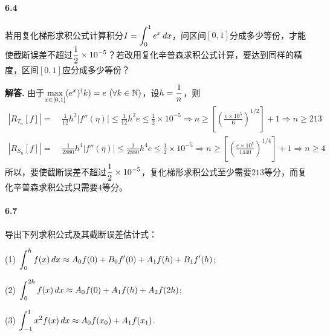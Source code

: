\documentclass[12pt, a4paper, oneside]{ctexart}
\newenvironment{solution}{\par\noindent\textbf{解答. }}{\bigskip\par}
\begin{document}
\paragraph{6.4}若用复化梯形求积公式计算积分$\displaystyle I = \int_0^1e^x\,dx$，问区间$[0,1]$分成多少等份，才能使截断误差不超过$\displaystyle\frac{1}{2}\times 10^{-5}$？若改用复化辛普森求积公式计算，要达到同样的精度，区间$[0,1]$应分成多少等份？
\begin{solution}
    由于$\displaystyle\max_{x\in[0,1]}(e^{x})^(k) = e\ (\forall k\in \mathbb{N})$，设$\displaystyle h = \frac{1}{n}$，则
    \begin{equation*}
        \begin{aligned}
            |R_{T_n}[f]| =&\ \frac{1}{12}h^2|f''(\eta)|\leqslant \frac{1}{12}h^2e\leqslant \frac{1}{2}\times10^{-5}\Rightarrow n\geqslant \left[\left(\frac{e\times 10^5}{6}\right)^{1/2}\right]+1\Rightarrow n\geqslant 213\\
            |R_{S_n}[f]| =&\ \frac{1}{2880}h^4|f''(\eta)|\leqslant \frac{1}{2880}h^4e\leqslant \frac{1}{2}\times10^{-5}\Rightarrow n\geqslant \left[\left(\frac{e\times 10^5}{1440}\right)^{1/4}\right]+1\Rightarrow n\geqslant 4
        \end{aligned}
    \end{equation*}
    所以，要使截断误差不超过$\displaystyle\frac{1}{2}\times10^{-5}$，复化梯形求积公式至少需要$213$等分，而复化辛普森求积公式只需要$4$等分。
\end{solution}
\paragraph{6.7}导出下列求积公式及其截断误差估计式：

(1) $\displaystyle\int_0^hf(x)\,dx\approx A_0f(0)+B_0f'(0)+A_1f(h)+B_1f'(h)$;

(2) $\displaystyle\int_0^{2h}f(x)\,dx\approx A_0f(0)+A_1f(h)+A_2f(2h)$;

(3) $\displaystyle\int_{-1}^1x^2f(x)\,dx\approx A_0f(x_0)+A_1f(x_1)$.
\end{document}
